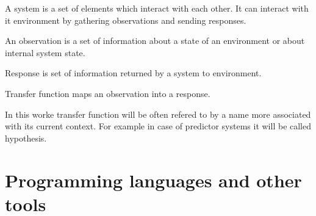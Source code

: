 \begin{definition}[System]
	A system is a set of elements which interact with each other. It can interact with it 
	environment by gathering observations and sending responses.
\end{definition}

\begin{definition}[Observation]
	An observation is a set of information about a state of an environment or about internal
	system state.
\end{definition}

\begin{definition}[Response]
	Response is set of information returned by a system to environment.
\end{definition}

\begin{definition}
	Transfer function maps an observation into a response.
\end{definition}
In this worke transfer function will be often refered to by a name more associated with its 
current context. For example in case of predictor systems it will be called hypothesis.

\section{Programming languages and other tools}
